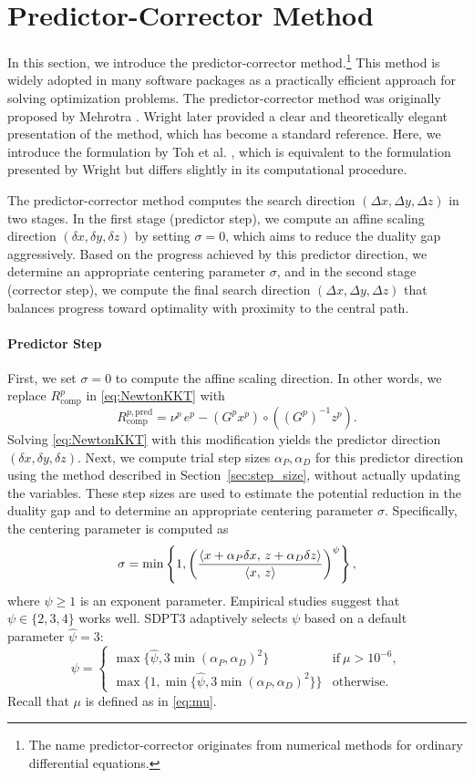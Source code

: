 \section{Predictor-Corrector Method}
In this section, we introduce the predictor-corrector method.\footnote{The name predictor-corrector originates from numerical methods for ordinary differential equations.}
This method is widely adopted in many software packages as a practically efficient approach for solving optimization problems.
The predictor-corrector method was originally proposed by Mehrotra \cite{Mehrotra1992}.
Wright \cite{Wright1997} later provided a clear and theoretically elegant presentation of the method, which has become a standard reference.
Here, we introduce the formulation by Toh et al. \cite{toh1999}, which is equivalent to the formulation presented by Wright but differs slightly in its computational procedure.

The predictor-corrector method computes the search direction $(\Delta x, \Delta y, \Delta z)$ in two stages.
In the first stage (predictor step), we compute an affine scaling direction $(\delta x, \delta y, \delta z)$ by setting $\sigma = 0$, which aims to reduce the duality gap aggressively.
Based on the progress achieved by this predictor direction, we determine an appropriate centering parameter $\sigma$, and in the second stage (corrector step), we compute the final search direction $(\Delta x, \Delta y, \Delta z)$ that balances progress toward optimality with proximity to the central path.


\paragraph{Predictor Step}
First, we set $\sigma=0$ to compute the affine scaling direction.
In other words, we replace $R^p_{\text{comp}}$ in \eqref{eq:NewtonKKT} with
\[R^{p,\text{pred}}_{\text{comp}}=\nu^p \, e^p - (G^p x^p) \circ ((G^p)^{-1} z^p).\]
Solving \eqref{eq:NewtonKKT} with this modification yields the predictor direction $(\delta x, \delta y, \delta z)$.
Next, we compute trial step sizes $\alpha_P, \alpha_D$ for this predictor direction using the method described in Section~\ref{sec:step_size}, without actually updating the variables.
These step sizes are used to estimate the potential reduction in the duality gap and to determine an appropriate centering parameter $\sigma$.
Specifically, the centering parameter is computed as
\[
   \sigma=\min\left\{1, \left(\frac{\left\langle x + \alpha_P \delta x, \, z + \alpha_D \delta z \right\rangle}{\left\langle x, \, z \right\rangle}\right)^\psi\right\},
\]
where $\psi \ge 1$ is an exponent parameter.
Empirical studies suggest that $\psi \in \{2,3,4\}$ works well.
SDPT3 adaptively selects $\psi$ based on a default parameter $\hat{\psi}=3$:
\[
\psi = \begin{cases}
    \max\{\hat{\psi}, 3 \min(\alpha_P, \alpha_D)^2\} & \text{if} ~ \mu > 10^{-6}, \\
    \max\{1, \min\{\hat{\psi}, 3 \min(\alpha_P, \alpha_D)^2\}\} & \text{otherwise}.
\end{cases}
\]
Recall that $\mu$ is defined as in \eqref{eq:mu}.

